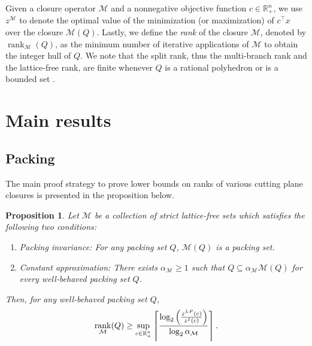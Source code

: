 \documentclass[11pt]{article}
\newcommand{\Z}{\mathbb{Z}}
\newcommand{\R}{\mathbb{R}}
\newcommand{\seq}{\subseteq}
\DeclareMathOperator{\conv}{conv}
\DeclareMathOperator{\rank}{rank}
\renewcommand{\S}{\mathcal{S}}
\newcommand{\Sk}{\S^{k}}
\renewcommand{\L}{\mathcal{L}}
\newcommand{\Mset}{M}
\newcommand{\M}{\mathcal{\Mset}}
\newtheorem{proposition}{Proposition}
\newcommand{\cred}{\color{black}}
\newcommand{\zLPc}{z^{LP}(c)}
\newcommand{\zIc}{z^{I}(c)}
\def\conv{\mathop{\rm conv}}
\def\int{\mathop{\rm int}}
\begin{document}


Given a closure operator $\M$ and a nonnegative objective function $c \in \R^n_+$, we use $z^{\M}$ to denote the optimal value of the minimization (or  maximization) of $c^\top x$ over the closure $\M(Q)$. Lastly, we define the \emph{rank} of the closure $\M$, denoted by $\rank_{\M}(Q)$, as the minimum number of iterative applications of $\M$ to obtain the integer hull of $Q$. We note that the split rank, thus the multi-branch rank and the lattice-free rank, are finite whenever $Q$ is a rational polyhedron or is a bounded set \cite{Schrijver80}. 
\section{Main results}
\label{sec:Statements}
\subsection{Packing} 
The main proof strategy to prove lower bounds on ranks of various cutting plane closures is presented in the proposition below. 

\begin{proposition}
\label{thm:thm1}
Let $\M$ be a collection of strict lattice-free sets which satisfies the following two conditions:
\begin{enumerate}
\item Packing invariance: For any packing set $Q$, $\M(Q)$ is a packing set.
\item Constant approximation: There exists $\alpha_\M \geq 1$ such that $Q \seq \alpha_\M \M(Q)$ for every well-behaved packing set $Q$.
\end{enumerate}

Then, for any well-behaved packing set $Q$, 
$$\rank_{\M}(Q) \geq {\cred \sup_{c \in \R_+^n}} \left\lceil \frac {\log_2 \left( \frac{\zLPc}{\zIc}\right)}{\log_2 \alpha_\M}\right\rceil.$$
\end{proposition}
\end{document}
